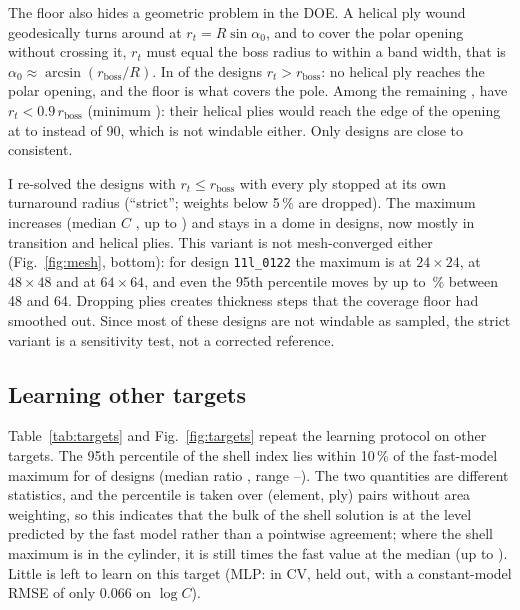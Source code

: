 \documentclass[11pt]{article}
\begin{document}
The floor also hides a geometric problem in the DOE. A helical ply wound geodesically turns around at $r_t = R\sin\alpha_0$, and to cover the polar opening without crossing it, $r_t$ must equal the boss radius to within a band width, that is $\alpha_0 \approx \arcsin(r_{\mathrm{boss}}/R)$. In \NdoeInconsistent{} of the \NdoeCases{} designs $r_t > r_{\mathrm{boss}}$: no helical ply reaches the polar opening, and the floor is what covers the pole. Among the remaining \NdoeConsistent{}, \NreachBelowNinety{} have $r_t < 0.9\,r_{\mathrm{boss}}$ (minimum \ReachMin{}): their helical plies would reach the edge of the opening at \ReachAngleMin\textdegree{} to \ReachAngleNinety\textdegree{} instead of 90\textdegree{}, which is not windable either. Only \NreachNearOne{} designs are close to consistent.

I re-solved the \NdoeConsistent{} designs with $r_t \le r_{\mathrm{boss}}$ with every ply stopped at its own turnaround radius (``strict''; weights below 5\,\% are dropped). The maximum increases (median $C$ \CstrictMedian{}, up to \CstrictMax{}) and stays in a dome in \NstrictDome{} designs, now mostly in transition and helical plies. This variant is not mesh-converged either (Fig.~\ref{fig:mesh}, bottom): for design \texttt{11l\_0122} the maximum is \StrictPeakTwentyFour{} at $24\times24$, \StrictPeakFortyEight{} at $48\times48$ and \StrictPeakSixtyFour{} at $64\times64$, and even the 95th percentile moves by up to \MeshStrictPninetyfiveFortyEight\,\% between 48 and 64. Dropping plies creates thickness steps that the coverage floor had smoothed out. Since most of these designs are not windable as sampled, the strict variant is a sensitivity test, not a corrected reference.

\subsection{Learning other targets}
Table~\ref{tab:targets} and Fig.~\ref{fig:targets} repeat the learning protocol on other targets. The 95th percentile of the shell index lies within 10\,\% of the fast-model maximum for \NCninetyfiveWithinTen{} of \NdoeCases{} designs (median ratio \CninetyfiveMedian{}, range \CninetyfiveMin{}--\CninetyfiveMax{}). The two quantities are different statistics, and the percentile is taken over (element, ply) pairs without area weighting, so this indicates that the bulk of the shell solution is at the level predicted by the fast model rather than a pointwise agreement; where the shell maximum is in the cylinder, it is still \CcylMedian{} times the fast value at the median (up to \CcylMax{}). Little is left to learn on this target (MLP: \RtwoCvMlpPninetyfive{} in CV, \RtwoEvalMlpPninetyfive{} held out, with a constant-model RMSE of only 0.066 on $\log C$).
\end{document}
